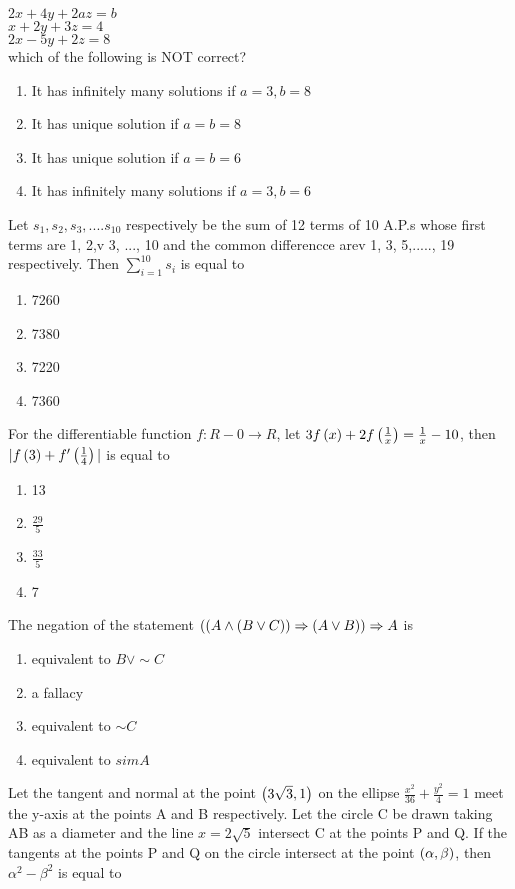 $2x + 4y + 2az = b$\\
$x +  2y + 3z = 4$\\
$2x - 5y +2z = 8$\\
which of the following is NOT correct?
\hfill{}
\begin{enumerate}
    \item It has infinitely many solutions if $a=3,b=8$
    \item It has unique solution if $a=b=8$
    \item It has unique solution if $a=b=6$
    \item It has infinitely many solutions if $a=3,b=6$
\end{enumerate}
\item Let $s_1,s_2,s_3,....s_{10}$ respectively be the sum of 12 terms of 10 A.P.s whose first terms are 1, 2,v 3, ..., 10 and the common differencce arev 1, 3, 5,....., 19 respectively. Then $\sum_{i=1}^{10} s_i$ is equal to 
\hfill{}
\begin{enumerate}
    \item 7260
    \item 7380
    \item 7220
    \item 7360
\end{enumerate}
\item For the differentiable function $f:R-{0}\rightarrow R$, let $3f\left(x\right)+2f\left(\frac{1}{x}\right)=\frac{1}{x}-10$, then $|f\left(3\right)+f^{\prime}\left(\frac{1}{4}\right)|$ is equal to
\hfill{}
\begin{enumerate}
    \item 13
    \item $\frac{29}{5}$
    \item $\frac{33}{5}$
    \item 7
\end{enumerate}
\item The negation of the statement $\left(\left(A \land \left(B \lor C\right)\right) \Rightarrow \left(A \lor B\right)\right) \Rightarrow A $ is
\hfill{}
\begin{enumerate}
    \item equivalent to $ B \lor \sim C $
    \item a fallacy
    \item equivalent to $ \sim C $
    \item equivalent to $ sim A $
\end{enumerate}
\item Let the tangent and normal at the point $\left(3\sqrt{3},1\right)$ on the ellipse $\frac{x^2}{36}+\frac{y^2}{4}=1$ meet the y-axis at the points A and B respectively. Let the circle C be drawn taking AB as a diameter and the line $x=2\sqrt{5}$ intersect C at the points P and Q. If the tangents at the points P and Q on the circle intersect at the point $\left(\alpha,\beta\right)$, then $\alpha^2 -\beta^2$ is equal to 
